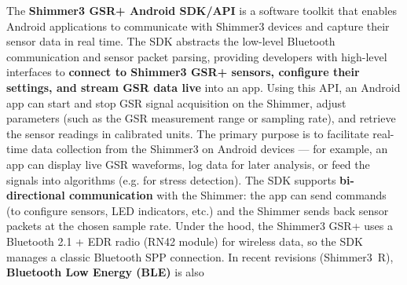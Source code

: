 The \textbf{Shimmer3 GSR+ Android SDK/API} is a software toolkit that enables
Android applications to communicate with Shimmer3 devices and capture
their sensor data in real time. The SDK abstracts the low-level
Bluetooth communication and sensor packet parsing, providing developers
with high-level interfaces to \textbf{connect to Shimmer3 GSR+ sensors,
configure their settings, and stream GSR data live} into an
app\cite{ref8}.
Using this API, an Android app can start and stop GSR signal acquisition
on the Shimmer, adjust parameters (such as the GSR measurement range or
sampling rate), and retrieve the sensor readings in calibrated units.
The primary purpose is to facilitate real-time data collection from the
Shimmer3 on Android devices --- for example, an app can display live GSR
waveforms, log data for later analysis, or feed the signals into
algorithms (e.g. for stress detection). The SDK supports
\textbf{bi-directional communication} with the Shimmer: the app can send
commands (to configure sensors, LED indicators, etc.) and the Shimmer
sends back sensor packets at the chosen sample rate. Under the hood, the
Shimmer3 GSR+ uses a Bluetooth 2.1 + EDR radio (RN42
module)\cite{ref9}
for wireless data, so the SDK manages a classic Bluetooth SPP
connection. In recent revisions (Shimmer3 R), \textbf{Bluetooth Low Energy
(BLE)} is also
